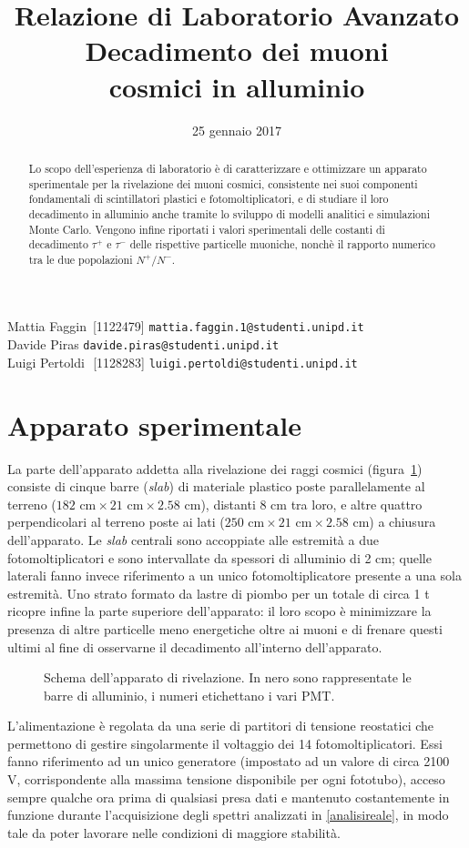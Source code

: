 \documentclass[10pt, oneside, a4paper]{article}   	%
\title{\large{Relazione di Laboratorio Avanzato}\\\Huge{Decadimento dei muoni \\ cosmici in alluminio}}
\date{25 gennaio 2017}
\begin{document}
\maketitle
\thispagestyle{empty}
%
\vspace{4cm}
\begin{abstract}
	Lo scopo dell'esperienza di laboratorio è di caratterizzare e ottimizzare un apparato sperimentale per la rivelazione dei muoni cosmici, consistente nei suoi componenti fondamentali di scintillatori plastici e fotomoltiplicatori, e di studiare il loro decadimento in alluminio anche tramite lo sviluppo di modelli analitici e simulazioni Monte Carlo. Vengono infine riportati i valori sperimentali delle costanti di decadimento $\tau^+$ e $\tau^-$ delle rispettive particelle muoniche, nonchè il rapporto numerico tra le due popolazioni $N^+/N^-$.
\end{abstract}
\vspace*{\fill}
Mattia Faggin \;\,[1122479] \texttt{mattia.faggin.1@studenti.unipd.it} \\
Davide Piras \;\;\;\:[1114287] \texttt{davide.piras@studenti.unipd.it} \\
Luigi Pertoldi \;\,\,[1128283] \texttt{luigi.pertoldi@studenti.unipd.it}
\cleardoublepage
%
\tableofcontents
\clearpage
\listoffigures
\listoftables
%
\clearpage
\section{Apparato sperimentale}
La parte dell'apparato addetta alla rivelazione dei raggi cosmici (figura~\ref{appScheme}) consiste di cinque barre (\emph{slab}) di materiale plastico poste parallelamente al terreno ($182 \text{ cm}\times21\text{ cm}\times2.58$ cm), distanti 8 cm tra loro, e altre quattro perpendicolari al terreno poste ai lati ($250\text{ cm}\times21\text{ cm}\times2.58$ cm) a chiusura dell'apparato. Le \emph{slab} centrali sono accoppiate alle estremità a due fotomoltiplicatori e sono intervallate da spessori di alluminio di 2 cm; quelle laterali fanno invece riferimento a un unico fotomoltiplicatore presente a una sola estremità. Uno strato formato da lastre di piombo per un totale di circa 1 t ricopre infine la parte superiore dell'apparato: il loro scopo è minimizzare la presenza di altre particelle meno energetiche oltre ai muoni e di frenare questi ultimi al fine di osservarne il decadimento all'interno dell'apparato.
%
\begin{figure}[h]
	\centering
		
	\caption{Schema dell'apparato di rivelazione. In nero sono rappresentate le barre di alluminio, i numeri etichettano i vari PMT.}
	\label{appScheme}
\end{figure}
%
L'alimentazione è regolata da una serie di partitori di tensione reostatici che permettono di gestire singolarmente il voltaggio dei 14 fotomoltiplicatori. Essi fanno riferimento ad un unico generatore (impostato ad un valore di circa 2100 V, corrispondente alla massima tensione disponibile per ogni fototubo), acceso sempre qualche ora prima di qualsiasi presa dati e mantenuto costantemente in funzione durante l'acquisizione degli spettri analizzati in \cref{analisireale}, in modo tale da poter lavorare nelle condizioni di maggiore stabilità.
\end{document}
